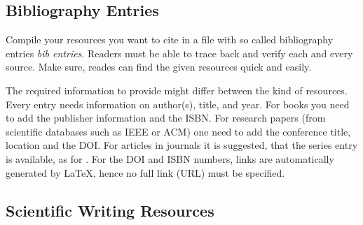 \subsection{Bibliography Entries}

Compile your resources you want to cite in a file with so called bibliography
entries \emph{bib entries}.
Readers must be able to trace back and verify each and every source.
Make sure, reades can find the given resources quick and easily.

The required information to provide might differ between the kind of resources.
Every entry needs information on author(s), title, and year.
For books you need to add the publisher information and the ISBN.
For research papers (from scientific databases such as IEEE or ACM)
one need to add the conference title, location and the \ac{DOI}.
For articles in journals it is suggested, that the series entry is available,
as for \cite{Chen:2023}.
For the DOI and \ac{ISBN} numbers, links are automatically generated by \LaTeX,
hence no full link (\ac{URL}) must be specified.

\subsection{Scientific Writing Resources}


